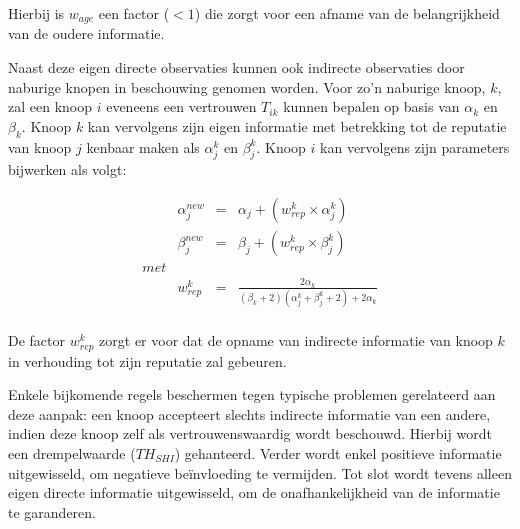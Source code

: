 Hierbij is $w_{age}$ een factor ($< 1$) die zorgt voor een afname van de
belangrijkheid van de oudere informatie.

Naast deze eigen directe observaties kunnen ook indirecte observaties door
naburige knopen in beschouwing genomen worden. Voor zo'n naburige knoop, $k$,
zal een knoop $i$ eveneens een vertrouwen $T_{ik}$ kunnen bepalen op basis van
$\alpha_k$ en $\beta_k$. Knoop $k$ kan vervolgens zijn eigen informatie met
betrekking tot de reputatie van knoop $j$ kenbaar maken als $\alpha^k_j$ en
$\beta^k_j$. Knoop $i$ kan vervolgens zijn parameters bijwerken als volgt:

\begin{equation} \label{eq:reputation-update-indirect}
\begin{array}{rrcl}
& \alpha^{new}_j & = & \alpha_j + ( w^k_{rep} \times \alpha^k_j ) \\
& \beta^{new}_j  & = & \beta_j  + ( w^k_{rep} \times \beta^k_j )  \\
met \\
& w^k_{rep}      & = & \frac{2 \alpha_k}{(\beta_k+2) (\alpha^k_j+\beta^k_j+2)+2 \alpha_k} \\
\end{array}
\end{equation}

De factor $w^k_{rep}$ zorgt er voor dat de opname van indirecte informatie van
knoop $k$ in verhouding tot zijn reputatie zal gebeuren.

Enkele bijkomende regels beschermen tegen typische problemen gerelateerd aan
deze aanpak: een knoop accepteert slechts indirecte informatie van een andere,
indien deze knoop zelf als vertrouwenswaardig wordt beschouwd. Hierbij wordt
een drempelwaarde ($TH_{SHI}$) gehanteerd. Verder wordt enkel positieve
informatie uitgewisseld, om negatieve be\"invloeding te vermijden. Tot slot
wordt tevens alleen eigen directe informatie uitgewisseld, om de
onafhankelijkheid van de informatie te garanderen.
